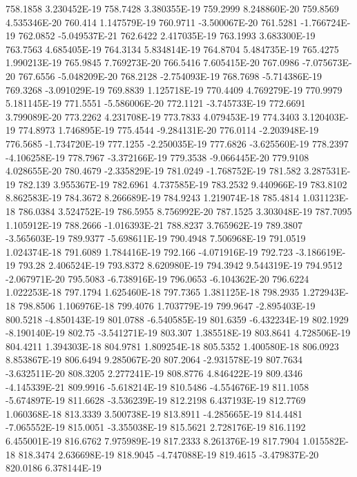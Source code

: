 758.1858  3.230452E-19
758.7428  3.380355E-19
759.2999  8.248860E-20
759.8569  4.535346E-20
760.414  1.147579E-19
760.9711  -3.500067E-20
761.5281  -1.766724E-19
762.0852  -5.049537E-21
762.6422  2.417035E-19
763.1993  3.683300E-19
763.7563  4.685405E-19
764.3134  5.834814E-19
764.8704  5.484735E-19
765.4275  1.990213E-19
765.9845  7.769273E-20
766.5416  7.605415E-20
767.0986  -7.075673E-20
767.6556  -5.048209E-20
768.2128  -2.754093E-19
768.7698  -5.714386E-19
769.3268  -3.091029E-19
769.8839  1.125718E-19
770.4409  4.769279E-19
770.9979  5.181145E-19
771.5551  -5.586006E-20
772.1121  -3.745733E-19
772.6691  3.799089E-20
773.2262  4.231708E-19
773.7833  4.079453E-19
774.3403  3.120403E-19
774.8973  1.746895E-19
775.4544  -9.284131E-20
776.0114  -2.203948E-19
776.5685  -1.734720E-19
777.1255  -2.250035E-19
777.6826  -3.625560E-19
778.2397  -4.106258E-19
778.7967  -3.372166E-19
779.3538  -9.066445E-20
779.9108  4.028655E-20
780.4679  -2.335829E-19
781.0249  -1.768752E-19
781.582  3.287531E-19
782.139  3.955367E-19
782.6961  4.737585E-19
783.2532  9.440966E-19
783.8102  8.862583E-19
784.3672  8.266689E-19
784.9243  1.219074E-18
785.4814  1.031123E-18
786.0384  3.524752E-19
786.5955  8.756992E-20
787.1525  3.303048E-19
787.7095  1.105912E-19
788.2666  -1.016393E-21
788.8237  3.765962E-19
789.3807  -3.565603E-19
789.9377  -5.698611E-19
790.4948  7.506968E-19
791.0519  1.024374E-18
791.6089  1.784416E-19
792.166  -4.071916E-19
792.723  -3.186619E-19
793.28  2.406524E-19
793.8372  8.620980E-19
794.3942  9.544319E-19
794.9512  -2.067971E-20
795.5083  -6.738916E-19
796.0653  -6.104362E-20
796.6224  1.022253E-18
797.1794  1.625460E-18
797.7365  1.381125E-18
798.2935  1.272943E-18
798.8506  1.106976E-18
799.4076  1.703779E-19
799.9647  -2.895403E-19
800.5218  -4.850143E-19
801.0788  -6.540585E-19
801.6359  -6.432234E-19
802.1929  -8.190140E-19
802.75  -3.541271E-19
803.307  1.385518E-19
803.8641  4.728506E-19
804.4211  1.394303E-18
804.9781  1.809254E-18
805.5352  1.400580E-18
806.0923  8.853867E-19
806.6494  9.285067E-20
807.2064  -2.931578E-19
807.7634  -3.632511E-20
808.3205  2.277241E-19
808.8776  4.846422E-19
809.4346  -4.145339E-21
809.9916  -5.618214E-19
810.5486  -4.554676E-19
811.1058  -5.674897E-19
811.6628  -3.536239E-19
812.2198  6.437193E-19
812.7769  1.060368E-18
813.3339  3.500738E-19
813.8911  -4.285665E-19
814.4481  -7.065552E-19
815.0051  -3.355038E-19
815.5621  2.728176E-19
816.1192  6.455001E-19
816.6762  7.975989E-19
817.2333  8.261376E-19
817.7904  1.015582E-18
818.3474  2.636698E-19
818.9045  -4.747088E-19
819.4615  -3.479837E-20
820.0186  6.378144E-19
